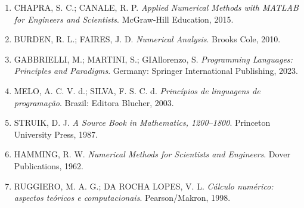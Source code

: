 \begin{enumerate}[label=\arabic*., leftmargin=*]

    \item CHAPRA, S. C.; CANALE, R. P.
    \textit{Applied Numerical Methods with MATLAB for Engineers and Scientists}.
    McGraw-Hill Education, 2015.

    \item BURDEN, R. L.; FAIRES, J. D.
    \textit{Numerical Analysis}.
    Brooks Cole, 2010.

    \item GABBRIELLI, M.; MARTINI, S.; GIAllorenzo, S.
    \textit{Programming Languages: Principles and Paradigms}.
    Germany: Springer International Publishing, 2023.

    \item MELO, A. C. V. d.; SILVA, F. S. C. d.
    \textit{Princípios de linguagens de programação}.
    Brazil: Editora Blucher, 2003.

    \item STRUIK, D. J.
    \textit{A Source Book in Mathematics, 1200--1800}.
    Princeton University Press, 1987.

    \item HAMMING, R. W.
    \textit{Numerical Methods for Scientists and Engineers}.
    Dover Publications, 1962.

    \item RUGGIERO, M. A. G.; DA ROCHA LOPES, V. L.
    \textit{Cálculo numérico: aspectos teóricos e computacionais}.
    Pearson/Makron, 1998.

\end{enumerate}

\clearpage